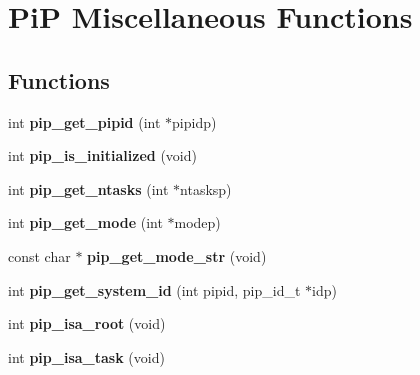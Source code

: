 \hypertarget{group__pip-5-misc}{\section{Pi\-P Miscellaneous Functions}
\label{group__pip-5-misc}
}
\subsection*{Functions}
\begin{DoxyCompactItemize}
\item 
\hypertarget{group__pip-5-misc_ga4e715bb8c325e9acc81af0745908dc0e}{int {\bfseries pip\-\_\-get\-\_\-pipid} (int $\ast$pipidp)}\label{group__pip-5-misc_ga4e715bb8c325e9acc81af0745908dc0e}

\item 
\hypertarget{group__pip-5-misc_gabbec4ae2f820b13400f63cba55a53399}{int {\bfseries pip\-\_\-is\-\_\-initialized} (void)}\label{group__pip-5-misc_gabbec4ae2f820b13400f63cba55a53399}

\item 
\hypertarget{group__pip-5-misc_ga9786d5aafa2a3882714c35ecc9f39a5a}{int {\bfseries pip\-\_\-get\-\_\-ntasks} (int $\ast$ntasksp)}\label{group__pip-5-misc_ga9786d5aafa2a3882714c35ecc9f39a5a}

\item 
\hypertarget{group__pip-5-misc_gab603f68c1ce972a5f3bfb8c95fcfb555}{int {\bfseries pip\-\_\-get\-\_\-mode} (int $\ast$modep)}\label{group__pip-5-misc_gab603f68c1ce972a5f3bfb8c95fcfb555}

\item 
\hypertarget{group__pip-5-misc_ga0e12c95fe7abc5c356acfd45a89ad5d8}{const char $\ast$ {\bfseries pip\-\_\-get\-\_\-mode\-\_\-str} (void)}\label{group__pip-5-misc_ga0e12c95fe7abc5c356acfd45a89ad5d8}

\item 
\hypertarget{group__pip-5-misc_gadf3d9e96b46d7a58bf4ce6dda173091a}{int {\bfseries pip\-\_\-get\-\_\-system\-\_\-id} (int pipid, pip\-\_\-id\-\_\-t $\ast$idp)}\label{group__pip-5-misc_gadf3d9e96b46d7a58bf4ce6dda173091a}

\item 
\hypertarget{group__pip-5-misc_ga6f1045bdbf682cb2ac504f09b57b73e9}{int {\bfseries pip\-\_\-isa\-\_\-root} (void)}\label{group__pip-5-misc_ga6f1045bdbf682cb2ac504f09b57b73e9}

\item 
\hypertarget{group__pip-5-misc_gaf0283e47ad2d415206d6a3fa61e8a0a9}{int {\bfseries pip\-\_\-isa\-\_\-task} (void)}\label{group__pip-5-misc_gaf0283e47ad2d415206d6a3fa61e8a0a9}


\end{DoxyCompactItemize}

